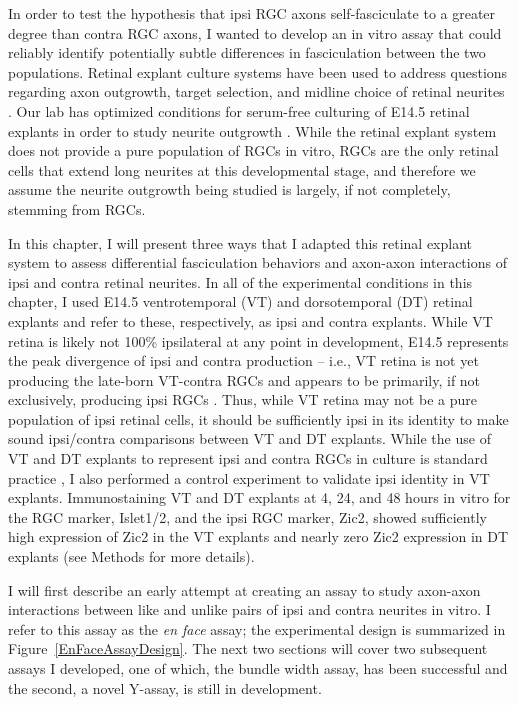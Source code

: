 In order to test the hypothesis that ipsi RGC axons self-fasciculate to a greater degree than contra RGC axons, I wanted to develop an in vitro assay that could reliably identify potentially subtle differences in fasciculation between the two populations.
Retinal explant culture systems have been used to address questions regarding axon outgrowth, target selection, and midline choice of retinal neurites \cite[e.g.][]{kuwajima2012optic,wang1996chemosuppression,bonhoeffer1985position}.
Our lab has optimized conditions for serum-free culturing of E14.5 retinal explants in order to study neurite outgrowth \cite[e.g.][]{kuwajima2012optic,petros2010ephrin,wang1996chemosuppression}.
While the retinal explant system does not provide a pure population of RGCs in vitro, RGCs are the only retinal cells that extend long neurites at this developmental stage, and therefore we assume the neurite outgrowth being studied is largely, if not completely, stemming from RGCs.

In this chapter, I will present three ways that I adapted this retinal explant system to assess differential fasciculation behaviors and axon-axon interactions of ipsi and contra retinal neurites.
In all of the experimental conditions in this chapter, I used E14.5 ventrotemporal (VT) and dorsotemporal (DT) retinal explants and refer to these, respectively, as ipsi and contra explants.
While VT retina is likely not 100\% ipsilateral at any point in development, E14.5 represents the peak divergence of ipsi and contra production -- i.e., VT retina is not yet producing the late-born VT-contra RGCs and appears to be primarily, if not exclusively, producing ipsi RGCs \cite{drager1985birth}.
Thus, while VT retina may not be a pure population of ipsi retinal cells, it should be sufficiently ipsi in its identity to make sound ipsi/contra comparisons between VT and DT explants.
While the use of VT and DT explants to represent ipsi and contra RGCs in culture is standard practice \cite[e.g.][]{kuwajima2012optic,petros2010ephrin}, I also performed a control experiment to validate ipsi identity in VT explants.
Immunostaining VT and DT explants at 4, 24, and 48 hours in vitro for the RGC marker, Islet1/2, and the ipsi RGC marker, Zic2, showed sufficiently high expression of Zic2 in the VT explants and nearly zero Zic2 expression in DT explants (see Methods for more details).

I will first describe an early attempt at creating an assay to study axon-axon interactions between like and unlike pairs of ipsi and contra neurites in vitro.
I refer to this assay as the \emph{en face} assay; the experimental design is summarized in Figure~\ref{EnFaceAssayDesign}.
The next two sections will cover two subsequent assays I developed, one of which, the bundle width assay, has been successful and the second, a novel Y-assay, is still in development.

